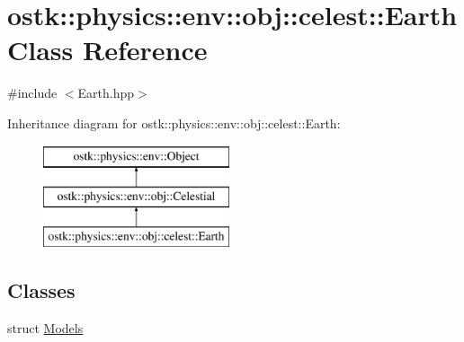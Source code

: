 \hypertarget{classostk_1_1physics_1_1env_1_1obj_1_1celest_1_1_earth}{}\section{ostk\+:\+:physics\+:\+:env\+:\+:obj\+:\+:celest\+:\+:Earth Class Reference}
\label{classostk_1_1physics_1_1env_1_1obj_1_1celest_1_1_earth}


{\ttfamily \#include $<$Earth.\+hpp$>$}

Inheritance diagram for ostk\+:\+:physics\+:\+:env\+:\+:obj\+:\+:celest\+:\+:Earth\+:\begin{figure}[H]
\begin{center}
\leavevmode
\includegraphics[height=3.000000cm]{classostk_1_1physics_1_1env_1_1obj_1_1celest_1_1_earth}
\end{center}
\end{figure}
\subsection*{Classes}
\begin{DoxyCompactItemize}
\item 
struct \hyperlink{structostk_1_1physics_1_1env_1_1obj_1_1celest_1_1_earth_1_1_models}{Models}
\end{DoxyCompactItemize}
